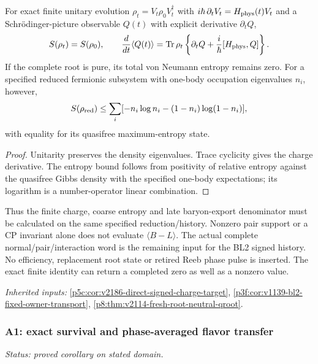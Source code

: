 \documentclass[12pt,a4paper]{article}
\begin{document}
For exact finite unitary evolution $\rho_t=V_t\rho_0V_t^\dagger$
with $i\hbar\,\partial_tV_t=H_{\rm phys}(t)V_t$ and a Schr\"odinger-picture
observable $Q(t)$ with explicit derivative $\partial_tQ$,
\[
 S(\rho_t)=S(\rho_0),\qquad
 \frac{d}{dt}\langle Q(t)\rangle
 =\operatorname{Tr}\rho_t
 \left\{\partial_t Q+\frac{i}{\hbar}[H_{\rm phys},Q]\right\}.
\]
If the complete root is pure, its total von Neumann entropy remains zero.
For a specified reduced fermionic subsystem with one-body occupation
eigenvalues $n_i$, however,
\[
 S(\rho_{\rm red})\le\sum_i[-n_i\log n_i-(1-n_i)\log(1-n_i)],
\]
with equality for its quasifree maximum-entropy state.
\begin{proof}
Unitarity preserves the density eigenvalues. Trace cyclicity
gives the charge derivative. The entropy bound follows from positivity of
relative entropy against the quasifree Gibbs density with the specified
one-body expectations; its logarithm is a number-operator linear combination.
\end{proof}
Thus the finite charge, coarse entropy and late baryon-export denominator
must be calculated on the same specified reduction/history. Nonzero pair
support or a CP invariant alone does not evaluate $\langle B-L\rangle$.
The actual complete normal/pair/interaction word is the remaining input for
the BL2 signed history. No efficiency, replacement root state or retired
Reeb phase pulse is inserted. The exact finite identity can return a
completed zero as well as a nonzero value.
\par\noindent\textit{Inherited inputs:} \ref{p5c:cor:v2186-direct-signed-charge-target}, \ref{p3f:cor:v1139-bl2-fixed-owner-transport}, \ref{p8:thm:v2114-fresh-root-neutral-qroot}.

\subsubsection{A1: exact survival and phase-averaged flavor transfer}
\label{p5c:sec:v2201-derived-a1}
\noindent\textit{Status: proved corollary on stated domain.}
\end{document}
